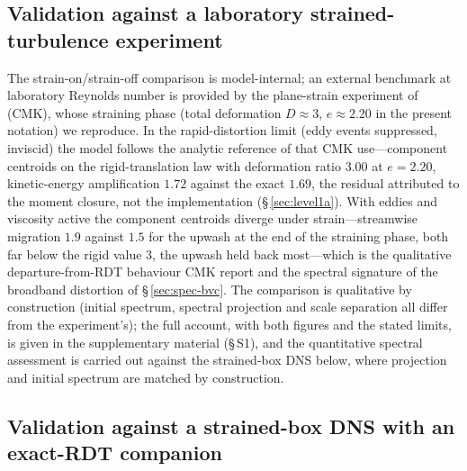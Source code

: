 \documentclass[lineno]{JFM-FLM_Au}
\begin{document}
\subsection{Validation against a laboratory strained-turbulence experiment}\label{sec:cmk}

The strain-on/strain-off comparison is model-internal; an external
benchmark at laboratory Reynolds number is provided by the plane-strain
experiment of \citet{ChenMeneveauKatz2006} (CMK), whose straining phase
(total deformation $D\approx3$, $e\approx2.20$ in the present notation)
we reproduce. In the rapid-distortion limit (eddy events suppressed,
inviscid) the model follows the analytic reference of
\citet{LeePiomelliReynolds1986} that CMK use---component centroids on
the rigid-translation law with deformation ratio $3.00$ at $e=2.20$,
kinetic-energy amplification $1.72$ against the exact $1.69$, the residual attributed to the moment closure, not the implementation (\S\,\ref{sec:level1a}). With eddies and viscosity active the component
centroids diverge under strain---streamwise migration $1.9$ against
$1.5$ for the upwash at the end of the straining phase, both far below
the rigid value $3$, the upwash held back most---which is the
qualitative departure-from-RDT behaviour CMK report and the spectral
signature of the broadband distortion of \S\,\ref{sec:spec-bvc}. The
comparison is qualitative by construction (initial spectrum, spectral
projection and scale separation all differ from the experiment's); the
full account, with both figures and the stated limits, is given in the
supplementary material (\S\,S1), and the quantitative spectral
assessment is carried out against the strained-box DNS below, where
projection and initial spectrum are matched by construction.

\subsection{Validation against a strained-box DNS with an exact-RDT
companion}\label{sec:box-dns}
\end{document}
